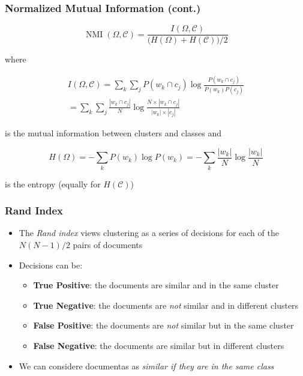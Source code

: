 \documentclass[svgnames]{beamer}
\begin{document}
\begin{frame}
    \frametitle{Normalized Mutual Information (cont.)}

    \begin{block}{}
        \begin{displaymath}
        \operatorname{NMI}(\Omega,\mathcal{C}) =
            \frac{I(\Omega,\mathcal{C})}{\big(H(\Omega)+H(\mathcal{C})\big)/2}
        \end{displaymath}
    \end{block}
    \footnotesize
    where
    \begin{block}{}
        \begin{multline*}
            I(\Omega,\mathcal{C}) = \sum_k\sum_jP(w_k \cap c_j)\log\frac{P(w_k \cap c_j)}{P(w_k)P(c_j)} \\
            = \sum_k\sum_j \frac{|w_k \cap c_j|}{N} \log\frac{N \times |w_k \cap c_j|}{|w_k| \times |c_j|}
        \end{multline*}
    \end{block}
    is the mutual information between clusters and classes and
    \begin{block}{}
        \begin{displaymath}
            H(\Omega) = -\sum_k P(w_k)\log{P(w_k)} = -\sum_k\frac{|w_k|}{N}\log\frac{|w_k|}{N}
        \end{displaymath}
    \end{block}
    is the entropy (equally for $H(\mathcal{C})$)
\end{frame}

\begin{frame}
    \frametitle{Rand Index}
    \begin{itemize}
    \item The \emph{Rand index} views clustering as a series of decisions for
        each of the $N(N-1)/2$ pairs of documents
    \item Decisions can be:
        \begin{itemize}
        \item \textbf{True Positive}: the documents are similar and in the same cluster
        \item \textbf{True Negative}: the documents are \textit{not} similar and in different clusters
        \item \textbf{False Positive}: the documents are \textit{not} similar but in the same cluster
        \item \textbf{False Negative}: the documents are similar but in different clusters
        \end{itemize}
    \item We can considere documentas as \emph{similar if they are in the same class}
    \end{itemize}
\end{frame}
\end{document}
